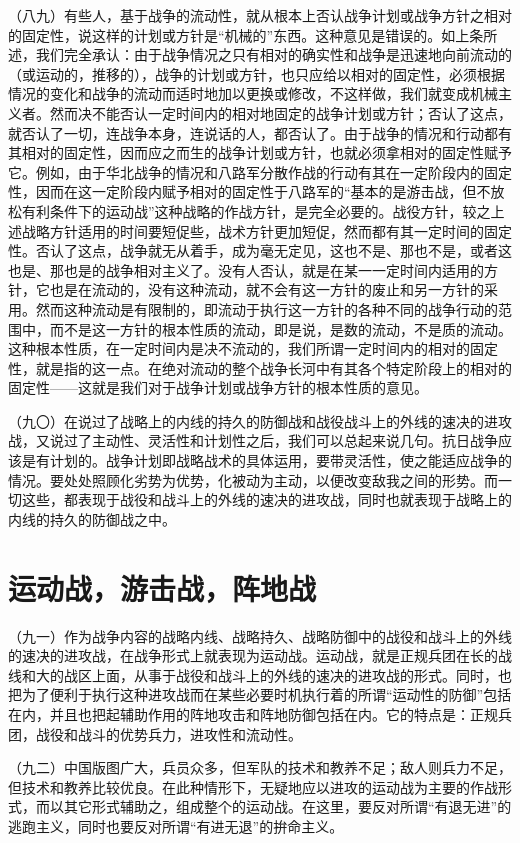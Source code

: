（八九）有些人，基于战争的流动性，就从根本上否认战争计划或战争方针之相对的固定性，说这样的计划或方针是“机械的”东西。这种意见是错误的。如上条所述，我们完全承认：由于战争情况之只有相对的确实性和战争是迅速地向前流动的（或运动的，推移的），战争的计划或方针，也只应给以相对的固定性，必须根据情况的变化和战争的流动而适时地加以更换或修改，不这样做，我们就变成机械主义者。然而决不能否认一定时间内的相对地固定的战争计划或方针；否认了这点，就否认了一切，连战争本身，连说话的人，都否认了。由于战争的情况和行动都有其相对的固定性，因而应之而生的战争计划或方针，也就必须拿相对的固定性赋予它。例如，由于华北战争的情况和八路军分散作战的行动有其在一定阶段内的固定性，因而在这一定阶段内赋予相对的固定性于八路军的“基本的是游击战，但不放松有利条件下的运动战”这种战略的作战方针，是完全必要的。战役方针，较之上述战略方针适用的时间要短促些，战术方针更加短促，然而都有其一定时间的固定性。否认了这点，战争就无从着手，成为毫无定见，这也不是、那也不是，或者这也是、那也是的战争相对主义了。没有人否认，就是在某一一定时间内适用的方针，它也是在流动的，没有这种流动，就不会有这一方针的废止和另一方针的采用。然而这种流动是有限制的，即流动于执行这一方针的各种不同的战争行动的范围中，而不是这一方针的根本性质的流动，即是说，是数的流动，不是质的流动。这种根本性质，在一定时间内是决不流动的，我们所谓一定时间内的相对的固定性，就是指的这一点。在绝对流动的整个战争长河中有其各个特定阶段上的相对的固定性——这就是我们对于战争计划或战争方针的根本性质的意见。

（九〇）在说过了战略上的内线的持久的防御战和战役战斗上的外线的速决的进攻战，又说过了主动性、灵活性和计划性之后，我们可以总起来说几句。抗日战争应该是有计划的。战争计划即战略战术的具体运用，要带灵活性，使之能适应战争的情况。要处处照顾化劣势为优势，化被动为主动，以便改变敌我之间的形势。而一切这些，都表现于战役和战斗上的外线的速决的进攻战，同时也就表现于战略上的内线的持久的防御战之中。

\section{运动战，游击战，阵地战}

（九一）作为战争内容的战略内线、战略持久、战略防御中的战役和战斗上的外线的速决的进攻战，在战争形式上就表现为运动战。运动战，就是正规兵团在长的战线和大的战区上面，从事于战役和战斗上的外线的速决的进攻战的形式。同时，也把为了便利于执行这种进攻战而在某些必要时机执行着的所谓“运动性的防御”包括在内，并且也把起辅助作用的阵地攻击和阵地防御包括在内。它的特点是：正规兵团，战役和战斗的优势兵力，进攻性和流动性。

（九二）中国版图广大，兵员众多，但军队的技术和教养不足；敌人则兵力不足，但技术和教养比较优良。在此种情形下，无疑地应以进攻的运动战为主要的作战形式，而以其它形式辅助之，组成整个的运动战。在这里，要反对所谓“有退无进”的逃跑主义，同时也要反对所谓“有进无退”的拚命主义。

